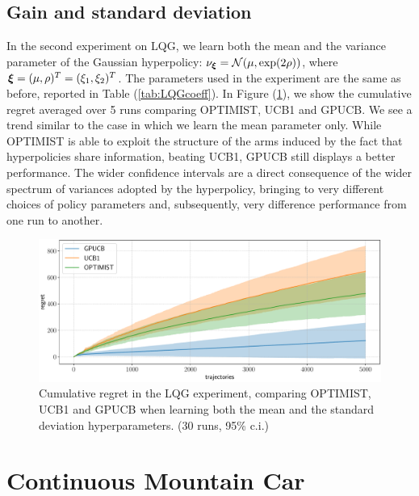\subsection{Gain and standard deviation}
In the second experiment on \gls{LQG}, we learn both the mean and the variance parameter of the Gaussian hyperpolicy: $\nu_{\boldsymbol{\xi}} = \mathcal{N}(\mu, \exp(2\rho))$, where $\boldsymbol{\xi}=(\mu,\rho)^T=(\xi_1,\xi_2)^T$. The parameters used in the experiment are the same as before, reported in Table (\ref{tab:LQGcoeff}).
In Figure (\ref{fig:LQGcomparisonVar}), we show the cumulative regret averaged over 5 runs comparing \gls{OPTIMIST}, \gls{UCB}1 and \gls{GPUCB}. We see a trend similar to the case in which we learn the mean parameter only. While \gls{OPTIMIST} is able to exploit the structure of the arms induced by the fact that hyperpolicies share information, beating \gls{UCB}1, \gls{GPUCB} still displays a better performance. The wider confidence intervals are a direct consequence of the wider spectrum of variances adopted by the hyperpolicy, bringing to very different choices of policy parameters and, subsequently, very difference performance from one run to another.

\begin{figure}[t!] 
\centering
\includegraphics[width=\textwidth,height=\textheight,keepaspectratio]{Images/LQGcomparisonVar.pdf}
\caption{Cumulative regret in
the \gls{LQG} experiment, comparing
\gls{OPTIMIST}, \gls{UCB}1 and \gls{GPUCB} when learning both the mean and the standard deviation hyperparameters.
(30 runs, 95\% c.i.)} 
\label{fig:LQGcomparisonVar} 
\end{figure}


\section{Continuous Mountain Car}

